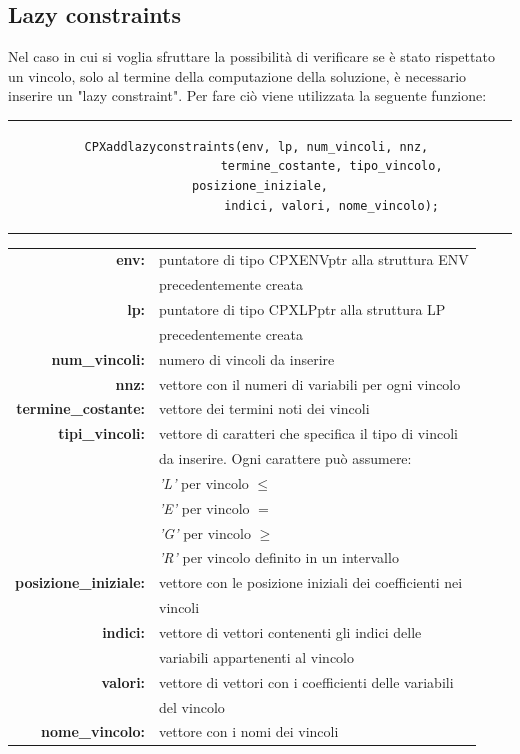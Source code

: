 \subsection{Lazy constraints}
Nel caso in cui si voglia sfruttare la possibilità di verificare se è stato rispettato un vincolo, solo al termine della computazione della soluzione, è necessario inserire un "lazy constraint". Per fare ciò viene utilizzata la seguente funzione:
\begin{center}
\begin{tabular}{c}
\begin{lstlisting}[linewidth=380pt, basicstyle=\footnotesize\sffamily,]     
CPXaddlazyconstraints(env, lp, num_vincoli, nnz, 
					termine_costante, tipo_vincolo, posizione_iniziale,
					indici, valori, nome_vincolo);
\end{lstlisting}
\end{tabular}
\end{center}
\begin{table}[h]
\centering
\begin{tabular}{rl}
\textbf{env:} & {puntatore di tipo CPXENVptr alla struttura ENV}\\
& {precedentemente creata}\\
\textbf{lp:} & {puntatore di tipo CPXLPptr alla struttura LP}\\
& {precedentemente creata}\\
\textbf{num\_vincoli:} & {numero di vincoli da inserire}\\
\textbf{nnz:} & {vettore con il numeri di variabili per ogni vincolo}\\ 
\textbf{termine\_costante:} & {vettore dei termini noti dei vincoli}\\
\textbf{tipi\_vincoli:} & {vettore di caratteri che specifica il tipo di vincoli}\\
&{da inserire. Ogni carattere può assumere:}\\
&{\textit{'L'} per vincolo $\leq$}\\
&{\textit{'E'} per vincolo $=$}\\
&{\textit{'G'} per vincolo $\geq$}\\
&{\textit{'R'} per vincolo definito in un intervallo}\\
\textbf{posizione\_iniziale:} & {vettore con le posizione iniziali dei coefficienti nei}\\
&{vincoli}\\
\textbf{indici:} & {vettore di vettori contenenti gli indici delle}\\
& {variabili appartenenti al vincolo}\\
\textbf{valori:} & {vettore di vettori con i coefficienti delle variabili }\\
&{del vincolo}\\
\textbf{nome\_vincolo:} & {vettore con i nomi dei vincoli}\\
\end{tabular}
\end{table}

